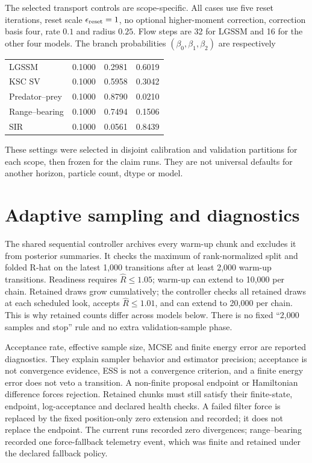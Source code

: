 The selected transport controls are scope-specific.  All cases use five reset
iterations, reset scale $\epsilon_{\rm reset}=1$, no optional higher-moment
correction, correction basis four, rate $0.1$ and radius $0.25$.  Flow steps
are 32 for LGSSM and 16 for the other four models.  The branch probabilities
$(\beta_0,\beta_1,\beta_2)$ are respectively
\begin{center}\small
\begin{tabular}{lccc}
\toprule
LGSSM & 0.1000 & 0.2981 & 0.6019\\
KSC SV & 0.1000 & 0.5958 & 0.3042\\
Predator--prey & 0.1000 & 0.8790 & 0.0210\\
Range--bearing & 0.1000 & 0.7494 & 0.1506\\
SIR & 0.1000 & 0.0561 & 0.8439\\
\bottomrule
\end{tabular}
\end{center}
These settings were selected in disjoint calibration and validation partitions
for each scope, then frozen for the claim runs.  They are not universal defaults
for another horizon, particle count, dtype or model.

\section{Adaptive sampling and diagnostics}
\label{sec:bf-surrogate-sequential-sampling}

The shared sequential controller archives every warm-up chunk and excludes it
from posterior summaries.  It checks the maximum of rank-normalized split and
folded R-hat on the latest 1,000 transitions after at least 2,000 warm-up
transitions.  Readiness requires $\widehat R\leq1.05$; warm-up can extend to
10,000 per chain.  Retained draws grow
cumulatively; the controller checks all retained draws at each scheduled look,
accepts $\widehat R\leq1.01$, and can extend to 20,000 per chain.  This is why
retained counts differ across models below.  There is no fixed ``2,000 samples
and stop'' rule and no extra validation-sample phase.

Acceptance rate, effective sample size, MCSE and finite energy error are
reported diagnostics.  They explain sampler behavior and estimator precision;
acceptance is not convergence evidence, ESS is not a convergence criterion, and
a finite energy error does not veto a transition.  A non-finite proposal endpoint or Hamiltonian difference forces rejection.
Retained chunks must still satisfy their finite-state, endpoint, log-acceptance
and declared health checks.  A failed filter force is replaced by the fixed
position-only zero extension and recorded; it does not replace the endpoint.  The current
runs recorded zero divergences; range--bearing recorded one force-fallback
telemetry event, which was finite and retained under the declared fallback
policy.

